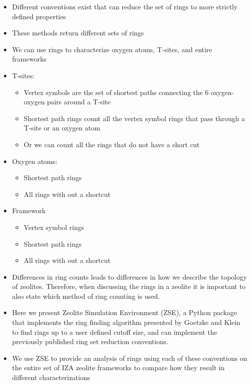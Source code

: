 \documentclass[11pt]{article}
\begin{document}
\begin{itemize}
\item Different conventions exist that can reduce the set of rings to more strictly defined properties
\item These methods return different sets of rings
\item We can use rings to characterize oxygen atoms, T-sites, and entire frameworks
\item T-sites:
\begin{itemize}
\item Vertex symbols are the set of shortest paths connecting the 6 oxygen-oxygen pairs around a T-site \cite{okeeffe-vertex-1997}
\item Shortest path rings count all the vertex symbol rings that pass through a T-site or an oxygen atom \cite{sastre-topological-2009}
\item Or we can count all the rings that do not have a short cut \cite{goetzke-properties-1991}
\end{itemize}
\item Oxygen atoms:
\begin{itemize}
\item Shortest path rings
\item All rings with out a shortcut
\end{itemize}
\item Framework
\begin{itemize}
\item Vertex symbol rings
\item Shortest path rings
\item All rings with out a shortcut
\end{itemize}
\item Differences in ring counts leads to differences in how we describe the topology of zeolites. Therefore, when discussing the rings in a zeolite it is important to also state which method of ring counting is used.
\item Here we present Zeolite Simulation Environment (ZSE), a Python package that implements the ring finding algorithm presented by Goetzke and Klein \cite{goetzke-properties-1991} to find rings up to a user defined cutoff size, and can implement the previously published ring set reduction conventions.
\item We use ZSE to provide an analysis of rings using each of these conventions on the entire set of IZA zeolite frameworks to compare how they result in different characterizations
\end{itemize}
\end{document}
